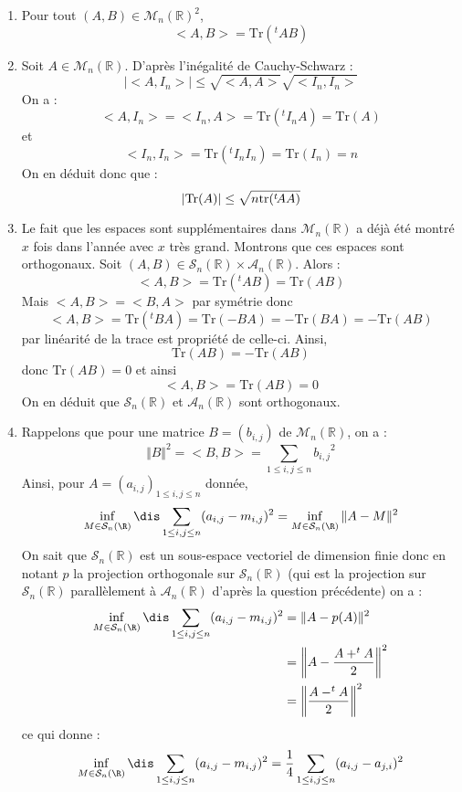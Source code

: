 \documentclass[a4paper,10pt]{report}
\begin{document}
\begin{enumerate}
\item Pour tout $(A,B) \in \mathcal{M}_n(\mathbb{R})^2$,
$$ <A,B> = \textrm{Tr}(^tAB)$$
\item Soit $A \in \mathcal{M}_n(\mathbb{R})$. D'après l'inégalité de Cauchy-Schwarz :
$$ \vert <A,I_n> \vert \leq \sqrt{<A,A>} \sqrt{<I_n,I_n>}$$
On a :
$$ <A,I_n>=<I_n,A> = \textrm{Tr}(^tI_nA) = \textrm{Tr}(A)$$
et 
$$ <I_n,I_n> = \textrm{Tr}(^tI_n I_n) = \textrm{Tr}(I_n) = n$$
On en déduit donc que :
$$ \vert\textrm{Tr}(A) \vert \leq \sqrt{n\hbox{tr}(^t\!AA)}$$
\item Le fait que les espaces sont supplémentaires dans $\mathcal{M}_n(\mathbb{R})$ a déjà été montré $x$ fois dans l'année avec $x$ très grand. Montrons que ces espaces sont orthogonaux. Soit $(A,B) \in \mathcal{S}_n(\mathbb{R}) \times \mathcal{A}_n(\mathbb{R})$. Alors :
$$ <A,B> = \textrm{Tr}(^tAB) = \textrm{Tr}(AB)$$
Mais $<A,B>=<B,A>$ par symétrie donc
$$ <A,B> = \textrm{Tr}(^tBA)  = \textrm{Tr}(-BA) =- \textrm{Tr}(BA) = - \textrm{Tr}(AB)$$
par linéarité de la trace est propriété de celle-ci. Ainsi,
$$  \textrm{Tr}(AB) =  - \textrm{Tr}(AB)$$
donc $\textrm{Tr}(AB)=0$ et ainsi 
$$ <A,B> = \textrm{Tr}(AB) = 0$$
On en déduit que $\mathcal{S}_n(\mathbb{R})$ et $\mathcal{A}_n(\mathbb{R})$ sont orthogonaux.
\item Rappelons que pour une matrice $B=(b_{i,j})$ de $\mathcal{M}_n(\mathbb{R})$, on a :
$$ \Vert B \Vert^2 = <B,B> = \sum_{1 \leq i,j \leq n} {b_{i,j}}^2$$
Ainsi, pour $A=(a_{i,j})_{1 \leq i,j \leq n}$ donn\'ee,
$$ \inf_{M\in{\cal S}_n(\R)}\dis\sum_{1 \leq i,j \leq n}(a_{i,j}-m_{i,j})^2  = \inf_{M\in{\cal S}_n(\R)} \Vert A-M \Vert^2 $$
On sait que $\mathcal{S}_n(\mathbb{R})$ est un sous-espace vectoriel de dimension finie donc en notant $p$ la projection orthogonale sur $\mathcal{S}_n(\mathbb{R})$ (qui est la projection sur $\mathcal{S}_n(\mathbb{R})$ parallèlement à $\mathcal{A}_n(\mathbb{R})$ d'après la question précédente) on a :
\begin{align*}
 \inf_{M\in{\cal S}_n(\R)}\dis\sum_{1 \leq i,j \leq n}(a_{i,j}-m_{i,j})^2 & = \Vert A-p(A) \Vert^2 \\
 & = \left\Vert A- \dfrac{A+^tA}{2} \right\Vert^2 \\
 & =  \left\Vert \dfrac{A-^tA}{2} \right\Vert^2 
 \end{align*}
 ce qui donne :
 $$  \inf_{M\in{\cal S}_n(\R)}\dis\sum_{1 \leq i,j \leq n}(a_{i,j}-m_{i,j})^2 = \dfrac{1}{4} \sum_{1 \leq i,j \leq n} (a_{i,j}-a_{j,i})^2$$
\end{enumerate}
\end{document}
